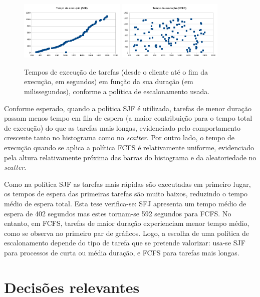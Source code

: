 \documentclass[11pt]{article}
\begin{document}
\begin{figure}[H]
    \centering
    \includegraphics[width=0.45\textwidth]{report_figures/ScatterSJF.png}
    \includegraphics[width=0.45\textwidth]{report_figures/ScatterFCFS.png}
    \caption{Tempos de execução de tarefas (desde o cliente até o fim da execução, em segundos) em
        função da sua duração (em milissegundos), conforme a política de escalonamento usada.}
\end{figure}

Conforme esperado, quando a política SJF é utilizada, tarefas de menor duração passam menos tempo em
fila de espera (a maior contribuição para o tempo total de execução) do que as tarefas mais longas,
evidenciado pelo comportamento crescente tanto no histograma como no \emph{scatter}. Por outro lado,
o tempo de execução quando se aplica a política FCFS é relativamente uniforme, evidenciado pela
altura relativamente próxima das barras do histograma e da aleatoriedade no \emph{scatter}.

Como na política SJF as tarefas mais rápidas são executadas em primeiro lugar, os tempos de espera
das primeiras tarefas são muito baixos, reduzindo o tempo médio de espera total. Esta tese
verifica-se: SFJ apresenta um tempo médio de espera de 402 segundos mas estes tornam-se 592 segundos
para FCFS. No entanto, em FCFS, tarefas de maior duração experienciam menor tempo médio, como se
observa no primeiro par de gráficos. Logo, a escolha de uma política de escalonamento depende do
tipo de tarefa que se pretende valorizar: usa-se SJF para processos de curta ou média duração, e
FCFS para tarefas mais longas.

\section{Decisões relevantes}
\end{document}
